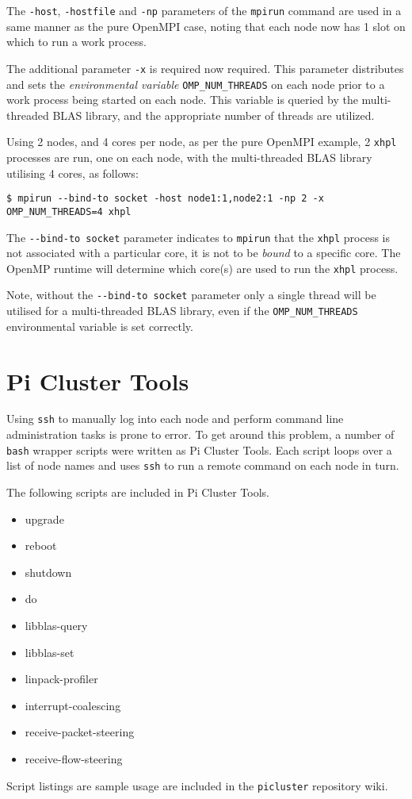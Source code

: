 The \verb|-host|, \verb|-hostfile| and \verb|-np| parameters of the \verb|mpirun| command are used in a same manner as the pure OpenMPI case, noting that each node now has 1 slot on which to run a work process.

The additional parameter \verb|-x| is required now required. This parameter distributes and sets the \emph{environmental variable} \verb|OMP_NUM_THREADS| on each node prior to a work process being started on each node. This variable is queried by the multi-threaded BLAS library, and the appropriate number of threads are utilized.

Using 2 nodes, and 4 cores per node, as per the pure OpenMPI example, 2 \verb|xhpl| processes are run, one on each node, with the multi-threaded BLAS library utilising 4 cores, as follows:

\lstset{style=type}
\begin{lstlisting}
$ mpirun --bind-to socket -host node1:1,node2:1 -np 2 -x OMP_NUM_THREADS=4 xhpl
\end{lstlisting}

The \verb|--bind-to socket| parameter indicates to \verb|mpirun| that the \verb|xhpl| process is not associated with a particular core, it is not to be \emph{bound} to a specific core. The OpenMP runtime will determine which core(s) are used to run the \verb|xhpl| process.

Note, without the \verb|--bind-to socket| parameter only a single thread will be utilised for a multi-threaded BLAS library, even if the \verb|OMP_NUM_THREADS| environmental variable is set correctly.


%
%
\section{Pi Cluster Tools}

Using \verb|ssh| to manually log into each node and perform command line administration tasks is prone to error. To get around this problem, a number of \verb|bash| wrapper scripts were written as Pi Cluster Tools. Each script loops over a list of node names and uses \verb|ssh| to run a remote command on each node in turn.

The following scripts are included in Pi Cluster Tools.

\begin{itemize}
\item upgrade
\item reboot
\item shutdown
\item do
\item libblas-query
\item libblas-set
\item linpack-profiler
\item interrupt-coalescing
\item receive-packet-steering
\item receive-flow-steering
\end{itemize}

Script listings are sample usage are included in the \verb|picluster| repository wiki.
